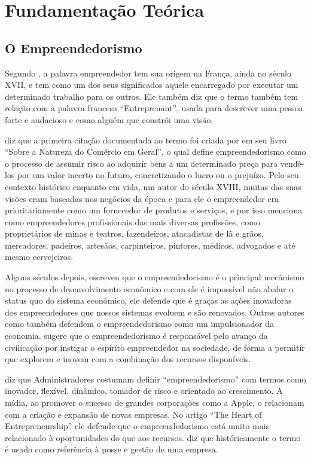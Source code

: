 \chapter[Fundamentação Teórica]{Fundamentação Teórica}
\label{cap-fundamentacao_teorica}

\section{O Empreendedorismo}
\label{section:o_empreendedorismo}

Segundo , a palavra empreendedor tem sua origem na França, ainda no século XVII, e tem como um dos seus significados aquele encarregado por executar um determinado trabalho para os outros. Ele também diz que o termo também tem relação com a palavra francesa ``Entreprenant'', usada para descrever uma pessoa forte e audacioso e como alguém que constrói uma visão.

 diz que a primeira citação documentada ao termo foi criada por  em seu livro ``Sobre a Natureza do Comércio em Geral'', o qual define empreendedorismo como o processo de assumir risco ao adquirir bens a um determinado preço para vendê-los por um valor incerto no futuro, concretizando o lucro ou o prejuízo. Pelo seu contexto histórico enquanto em vida, um autor do século XVIII, muitas das suas visões eram baseadas nos negócios da época e para ele o empreendedor era prioritariamente como um fornecedor de produtos e serviços, e por isso menciona como empreendedores profissionais das mais diversas profissões, como proprietários de minas e teatros, fazendeiros, atacadistas de lã e grãos, mercadores, padeiros, artesãos, carpinteiros, pintores, médicos, advogados e até mesmo cervejeiros. 

Alguns séculos depois,  escreveu que o empreendedorismo é o principal mecânismo no processo de desenvolvimento econômico e com ele é impossível não abalar o status quo do sistema econômico, ele defende que é graças as ações inovadoras dos empreendedores que nossos sistemas evoluem e são renovados. Outros autores como  também defendem o empreendedorismo como um impulsionador da economia.  sugere que o empreendedorismo é responsável pelo avanço da civilicação por instigar o espiríto empreendedor na sociedade, de forma a permitir que explorem e inovem com a combinação dos recursos disponíveis.

 diz que Administradores costumam definir ``empreendedorismo'' com termos como inovador, flexível, dinâmico, tomador de risco e orientado ao crescimento. A mídia, ao promover o sucesso de grandes corporações como a Apple, o relacionam com a criação e expansão de novas empresas. No artigo ``The Heart of Entrepreneurship'' ele defende que o empreendedorismo está muito mais relacionado à oportunidades do que aos recursos.  diz que históricamente o termo é usado como referência à posse e gestão de uma empresa.

